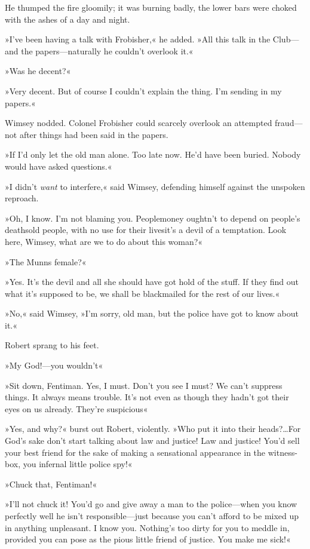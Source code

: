 He thumped the fire gloomily; it was burning badly, the lower bars were choked with the ashes of a day and night.

»I've been having a talk with Frobisher,« he added. »All this talk in the Club—and the papers—naturally he couldn't overlook it.«

»Was he decent?«

»Very decent. But of course I couldn't explain the thing. I'm sending in my papers.«

Wimsey nodded. Colonel Frobisher could scarcely overlook an attempted fraud—not after things had been said in the papers.

»If I'd only let the old man alone. Too late now. He'd have been buried. Nobody would have asked questions.«

»I didn't \textit{want} to interfere,« said Wimsey, defending himself against the unspoken reproach.

»Oh, I know. I'm not blaming you. People\textellipsis  money oughtn't to depend on people's deaths\textellipsis  old people, with no use for their lives\textellipsis  it's a devil of a temptation. Look here, Wimsey, what are we to do about this woman?«

»The Munns female?«

»Yes. It's the devil and all she should have got hold of the stuff. If they find out what it's supposed to be, we shall be blackmailed for the rest of our lives.«

»No,« said Wimsey, »I'm sorry, old man, but the police have got to know about it.«

Robert sprang to his feet.

»My God!—you wouldn't\longdash«

»Sit down, Fentiman. Yes, I must. Don't you see I must? We can't suppress things. It always means trouble. It's not even as though they hadn't got their eyes on us already. They're suspicious\longdash«

»Yes, and why?« burst out Robert, violently. »Who put it into their heads?\dots For God's sake don't start talking about law and justice! Law and justice! You'd sell your best friend for the sake of making a sensational appearance in the witness-box, you infernal little police spy!«

»Chuck that, Fentiman!«

»I'll not chuck it! You'd go and give away a man to the police—when you know perfectly well he isn't responsible—just because you can't afford to be mixed up in anything unpleasant. I know you. Nothing's too dirty for you to meddle in, provided you can pose as the pious little friend of justice. You make me sick!«


